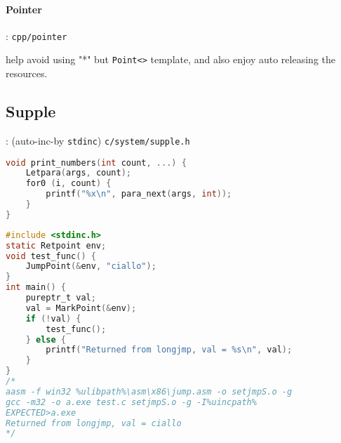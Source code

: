 \paragraph{Pointer}

: \verb`cpp/pointer`

help avoid using "*" but \verb`Point<>` template, and also enjoy auto releasing the resources.

\subsection{Supple}

: (auto-inc-by \verb`stdinc`) \verb`c/system/supple.h`


\begin{lstlisting}[language=C]
void print_numbers(int count, ...) {
	Letpara(args, count);
	for0 (i, count) {
		printf("%x\n", para_next(args, int));
	}
}
\end{lstlisting}


\begin{lstlisting}[language=C]
#include <stdinc.h>
static Retpoint env;
void test_func() {
	JumpPoint(&env, "ciallo");
}
int main() {
	pureptr_t val;
	val = MarkPoint(&env);
	if (!val) {
		test_func();
	} else {
		printf("Returned from longjmp, val = %s\n", val);
	}
}
/*
aasm -f win32 %ulibpath%\asm\x86\jump.asm -o setjmpS.o -g
gcc -m32 -o a.exe test.c setjmpS.o -g -I%uincpath%
EXPECTED>a.exe
Returned from longjmp, val = ciallo
*/
\end{lstlisting}
